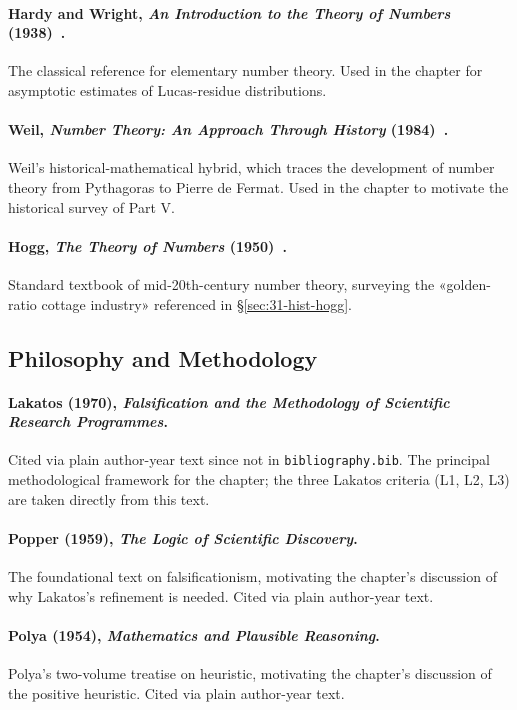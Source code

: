 \paragraph{Hardy and Wright, \emph{An Introduction to the Theory of Numbers} (1938)~\cite{hardy_wright}.} The classical reference for elementary number theory. Used in the chapter for asymptotic estimates of Lucas-residue distributions.

\paragraph{Weil, \emph{Number Theory: An Approach Through History} (1984)~\cite{weil_number_theory}.} Weil's historical-mathematical hybrid, which traces the development of number theory from Pythagoras to Pierre de Fermat. Used in the chapter to motivate the historical survey of Part V.

\paragraph{Hogg, \emph{The Theory of Numbers} (1950)~\cite{hogg_numbers}.} Standard textbook of mid-20th-century number theory, surveying the «golden-ratio cottage industry» referenced in §\ref{sec:31-hist-hogg}.

\subsection{Philosophy and Methodology}
\label{sec:31-refs-philosophy}

\paragraph{Lakatos (1970), \emph{Falsification and the Methodology of Scientific Research Programmes}.} Cited via plain author-year text since not in \texttt{bibliography.bib}. The principal methodological framework for the chapter; the three Lakatos criteria (L1, L2, L3) are taken directly from this text.

\paragraph{Popper (1959), \emph{The Logic of Scientific Discovery}.} The foundational text on falsificationism, motivating the chapter's discussion of why Lakatos's refinement is needed. Cited via plain author-year text.

\paragraph{Polya (1954), \emph{Mathematics and Plausible Reasoning}.} Polya's two-volume treatise on heuristic, motivating the chapter's discussion of the positive heuristic. Cited via plain author-year text.

